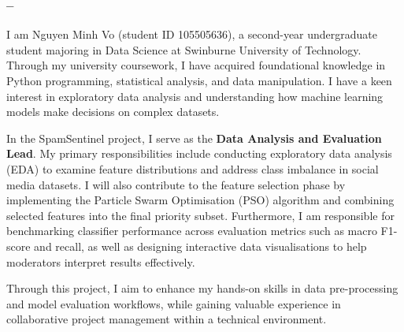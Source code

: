 \subsubsection{\memberTwo{} -- \memberTwoDiscipline}
{I am Nguyen Minh Vo (student ID 105505636), a second-year undergraduate student majoring in Data Science at Swinburne University of Technology. Through my university coursework, I have acquired foundational knowledge in Python programming, statistical analysis, and data manipulation. I have a keen interest in exploratory data analysis and understanding how machine learning models make decisions on complex datasets.

In the SpamSentinel project, I serve as the \textbf{Data Analysis and Evaluation Lead}. My primary responsibilities include conducting exploratory data analysis (EDA) to examine feature distributions and address class imbalance in social media datasets. I will also contribute to the feature selection phase by implementing the Particle Swarm Optimisation (PSO) algorithm and combining selected features into the final priority subset. Furthermore, I am responsible for benchmarking classifier performance across evaluation metrics such as macro F1-score and recall, as well as designing interactive data visualisations to help moderators interpret results effectively.

Through this project, I aim to enhance my hands-on skills in data pre-processing and model evaluation workflows, while gaining valuable experience in collaborative project management within a technical environment.}